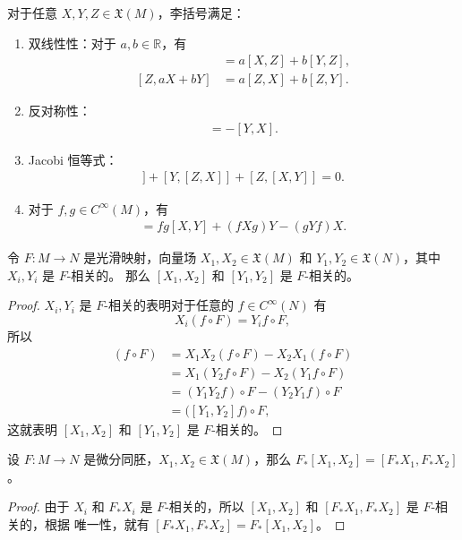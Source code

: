 \documentclass[fontset=none]{Notes}
\begin{document}
\begin{proposition}[李括号的性质]
  对于任意 $X,Y,Z\in \mathfrak{X}(M)$，李括号满足：
  \begin{enumerate}
    \item 双线性性：对于 $a,b\in \mathbb{R}$，有
    \begin{align*}
      [aX+bY,Z]&=a[X,Z]+b[Y,Z],\\
      [Z,aX+bY]&=a[Z,X]+b[Z,Y].
    \end{align*}
    \item 反对称性：
    \begin{align*}
      [X,Y]=-[Y,X].
    \end{align*}
    \item Jacobi 恒等式：
    \begin{align*}
      [X,[Y,Z]]+[Y,[Z,X]]+[Z,[X,Y]]=0.
    \end{align*}
    \item 对于 $f,g\in C^\infty(M)$，有
    \begin{align*}
      [fX,gY]=fg[X,Y]+(fXg)Y-(gYf)X.
    \end{align*}
  \end{enumerate}
\end{proposition}


\begin{proposition}[李括号的自然属性]
  令 $F:M\to N$ 是光滑映射，向量场 $X_1,X_2\in \mathfrak{X}(M)$
  和 $Y_1,Y_2\in \mathfrak{X}(N)$，其中 $X_i,Y_i$ 是 $F$-相关的。
  那么 $[X_1,X_2]$ 和 $[Y_1,Y_2]$ 是 $F$-相关的。
\end{proposition}
\begin{proof}
  $X_i,Y_i$ 是 $F$-相关的表明对于任意的 $f\in C^\infty(N)$ 有
  \[
    X_i(f\circ F)=Y_if\circ F,  
  \] 
  所以
  \begin{align*}
    [X_1,X_2](f\circ F)&=X_1X_2(f\circ F)-X_2X_1(f\circ F)\\
    &=X_1(Y_2f\circ F)-X_2(Y_1f\circ F)\\
    &=(Y_1Y_2f)\circ F-(Y_2Y_1f)\circ F \\
    &=\bigl([Y_1,Y_2]f\bigr)\circ F,
  \end{align*}
  这就表明 $[X_1,X_2]$ 和 $[Y_1,Y_2]$ 是 $F$-相关的。
\end{proof}

\begin{corollary}[李括号的推前]
  设 $F:M\to N$ 是微分同胚，$X_1,X_2\in \mathfrak{X}(M)$，那么
  $F_*[X_1,X_2]=[F_*X_1,F_*X_2]$。
\end{corollary}
\begin{proof}
  由于 $X_i$ 和 $F_*X_i$ 是 $F$-相关的，所以
  $[X_1,X_2]$ 和 $[F_*X_1,F_*X_2]$ 是 $F$-相关的，根据
  唯一性，就有 $[F_*X_1,F_*X_2]=F_*[X_1,X_2]$。
\end{proof}
\end{document}
